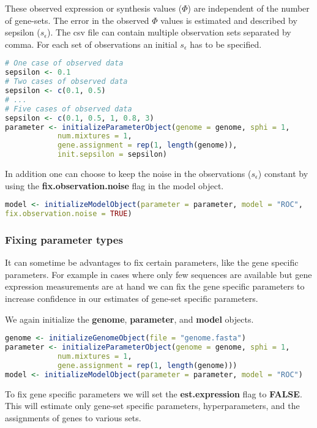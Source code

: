 These observed expression or synthesis values ($\Phi$) are independent of the number of gene-sets. 
The error in the observed $\Phi$ values is estimated and described by sepsilon ($s_\epsilon$). 
The csv file can contain multiple observation sets separated by comma.
For each set of observations an initial $s_\epsilon$ has to be specified.

\begin{lstlisting}[language=R]
# One case of observed data
sepsilon <- 0.1
# Two cases of observed data
sepsilon <- c(0.1, 0.5)
# ...
# Five cases of observed data
sepsilon <- c(0.1, 0.5, 1, 0.8, 3)
parameter <- initializeParameterObject(genome = genome, sphi = 1, 
			num.mixtures = 1,
			gene.assignment = rep(1, length(genome)),
			init.sepsilon = sepsilon)
\end{lstlisting}

In addition one can choose to keep the noise in the observations ($s_\epsilon$) constant by using the \textbf{fix.observation.noise} flag in the model object.

\begin{lstlisting}[language=R]
model <- initializeModelObject(parameter = parameter, model = "ROC",
fix.observation.noise = TRUE)
\end{lstlisting}

\subsubsection{Fixing parameter types}
It can sometime be advantages to fix certain parameters, like the gene specific parameters. 
For example in cases where only few sequences are available but gene expression measurements are at hand we can fix the gene specific parameters to increase confidence in our estimates of gene-set specific parameters.

We again initialize the \textbf{genome}, \textbf{parameter}, and \textbf{model} objects.

\begin{lstlisting}[language=R]
genome <- initializeGenomeObject(file = "genome.fasta")
parameter <- initializeParameterObject(genome = genome, sphi = 1, 
			num.mixtures = 1,
			gene.assignment = rep(1, length(genome)))
model <- initializeModelObject(parameter = parameter, model = "ROC")
\end{lstlisting}

To fix gene specific parameters we will set the \textbf{est.expression} flag to \textbf{FALSE}. This will estimate only gene-set
specific parameters, hyperparameters, and the assignments of genes to various sets.

